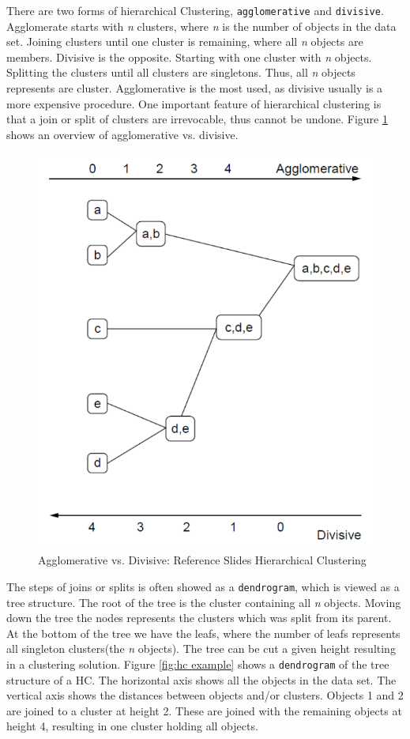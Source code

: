 \documentclass[a4paper,10pt]{article}
\theoremstyle{plain}
\theoremstyle{definition}
\begin{document}
There are two forms of hierarchical Clustering, \texttt{agglomerative} and \texttt{divisive}. Agglomerate starts with \textit{n} clusters, where \textit{n} is the number of objects in the data set. Joining clusters until one cluster is remaining, where all \textit{n} objects are members. Divisive is the opposite. Starting with one cluster with \textit{n} objects. Splitting the clusters until all clusters are singletons. Thus, all \textit{n} objects represents are cluster. Agglomerative is the most used, as divisive usually is a more expensive procedure. One important feature of hierarchical clustering is that a join or split of clusters are irrevocable, thus cannot be undone. Figure \ref{fig:agglo_vs_div} shows an overview of agglomerative vs. divisive.
\begin{figure}[H]
	\centering
	\includegraphics*[scale=0.3]{./pictures/hc/agglo_vs_div.png}
	\caption{Agglomerative vs. Divisive: Reference Slides Hierarchical Clustering}
	\label{fig:agglo_vs_div}
\end{figure} 
The steps of joins or splits is often showed as a \texttt{dendrogram}, which is viewed as a tree structure. The root of the tree is the cluster containing all \textit{n} objects. Moving down the tree the nodes represents the clusters which was split from its parent. At the bottom of the tree we have the leafs, where the number of leafs represents all singleton clusters(the \textit{n} objects). The tree can be cut a given height resulting in a clustering solution. Figure \ref{fig:hc example} shows a \texttt{dendrogram} of the tree structure of a HC. The horizontal axis shows all the objects in the data set. The vertical axis shows the distances between objects and/or clusters. Objects 1 and 2 are joined to a cluster at height 2. These are joined with the remaining objects at height 4, resulting in one cluster holding all objects.
\end{document}
